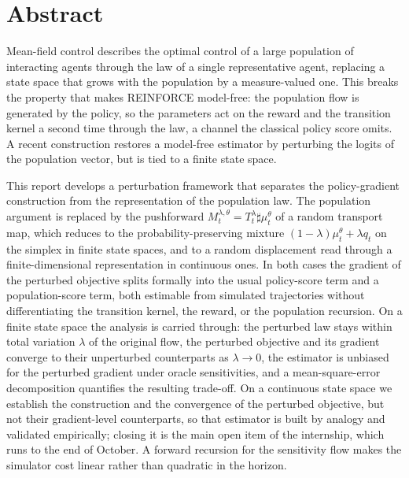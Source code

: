 \documentclass[11pt]{report}
\begin{document}
\section*{Abstract}

Mean-field control describes the optimal control of a large population of interacting agents through the law of a single representative agent, replacing a state space that grows with the population by a measure-valued one. This breaks the property that makes REINFORCE model-free: the population flow is generated by the policy, so the parameters act on the reward and the transition kernel a second time through the law, a channel the classical policy score omits. A recent construction restores a model-free estimator by perturbing the logits of the population vector, but is tied to a finite state space.

This report develops a perturbation framework that separates the policy-gradient construction from the representation of the population law. The population argument is replaced by the pushforward $M_t^{\lambda,\theta}=T_t^\lambda\sharp\mu_t^\theta$ of a random transport map, which reduces to the probability-preserving mixture $(1-\lambda)\mu_t^\theta+\lambda q_t$ on the simplex in finite state spaces, and to a random displacement read through a finite-dimensional representation in continuous ones. In both cases the gradient of the perturbed objective splits formally into the usual policy-score term and a population-score term, both estimable from simulated trajectories without differentiating the transition kernel, the reward, or the population recursion. On a finite state space the analysis is carried through: the perturbed law stays within total variation $\lambda$ of the original flow, the perturbed objective and its gradient converge to their unperturbed counterparts as $\lambda\to0$, the estimator is unbiased for the perturbed gradient under oracle sensitivities, and a mean-square-error decomposition quantifies the resulting trade-off. On a continuous state space we establish the construction and the convergence of the perturbed objective, but not their gradient-level counterparts, so that estimator is built by analogy and validated empirically; closing it is the main open item of the internship, which runs to the end of October. A forward recursion for the sensitivity flow makes the simulator cost linear rather than quadratic in the horizon.
\end{document}
